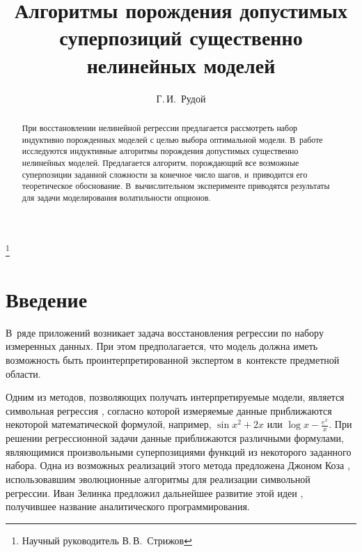 \documentclass[12pt,a4paper]{amsart}
\begin{document}
\pagestyle{plain}
\lstset{language=C++}

\title{Алгоритмы порождения допустимых суперпозиций существенно нелинейных моделей}
\author{Г.\,И.~Рудой}
\address{Московский физико-технический институт, ФУПМ, каф. <<Интеллектуальные системы>>}
\thanks{Научный руководитель В.\,В.~Стрижов}

\begin{abstract}
  При восстановлении нелинейной регрессии предлагается рассмотреть набор
  индуктивно порожденных моделей с целью выбора оптимальной модели. В~работе
  исследуются индуктивные алгоритмы порождения допустимых существенно
  нелинейных моделей. Предлагается алгоритм, порождающий все возможные
  суперпозиции заданной сложности за конечное число шагов, и~приводится его
  теоретическое обоснование. В~вычислительном эксперименте приводятся
  результаты для задачи моделирования волатильности опционов.
\end{abstract}

\maketitle

\section{Введение}

В~ряде приложений \cite{Barmpalexis201175, Shi:2011:CRM, DOI:10.1504/IJCENT.2010.038358}
возникает задача восстановления регрессии по набору измеренных данных.
При этом предполагается, что модель должна иметь возможность быть
проинтерпретированной экспертом в~контексте предметной области.

Одним из методов, позволяющих получать интерпретируемые модели, является
символьная регрессия \cite{davidson:2000:snrea, reference/ml/X10vc},
согласно которой измеряемые данные приближаются некоторой математической
формулой, например, $ \sin x^2 + 2x $ или $\log x - \frac{e^x}{x} $.
При решении регрессионной задачи данные приближаются различными формулами,
являющимися произвольными суперпозициями функций из некоторого заданного
набора. Одна из возможных реализаций этого метода
предложена Джоном Коза \cite{Koza1998GP, Koza1998Intro}, использовавшим
эволюционные алгоритмы для реализации символьной регрессии. Иван Зелинка
предложил дальнейшее развитие этой идеи \cite{Zelinka2008}, получившее
название аналитического программирования.
\end{document}
